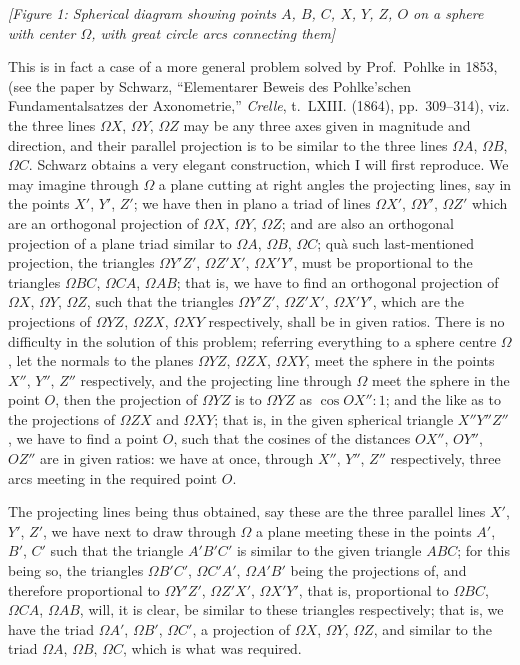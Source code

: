 \documentclass[11pt,a4paper]{article}
\theoremstyle{plain}
\theoremstyle{definition}
\theoremstyle{remark}
\begin{document}
\begin{center}
\textit{[Figure 1: Spherical diagram showing points $A$, $B$, $C$, $X$, $Y$, $Z$, $O$ on a sphere with center $\Omega$, with great circle arcs connecting them]}
\end{center}

This is in fact a case of a more general problem solved by Prof.~Pohlke in 1853, (see the paper by Schwarz, ``Elementarer Beweis des Pohlke'schen Fundamentalsatzes der Axonometrie,'' \textit{Crelle}, t.~LXIII. (1864), pp.~309--314), viz. the three lines $\Omega X$, $\Omega Y$, $\Omega Z$ may be any three axes given in magnitude and direction, and their parallel projection is to be similar to the three lines $\Omega A$, $\Omega B$, $\Omega C$. Schwarz obtains a very elegant construction, which I will first reproduce. We may imagine through $\Omega$ a plane cutting at right angles the projecting lines, say in the points $X'$, $Y'$, $Z'$; we have then in plano a triad of lines $\Omega X'$, $\Omega Y'$, $\Omega Z'$ which are an orthogonal projection of $\Omega X$, $\Omega Y$, $\Omega Z$; and are also an orthogonal projection of a plane triad similar to $\Omega A$, $\Omega B$, $\Omega C$; qu\`{a} such last-mentioned projection, the triangles $\Omega Y'Z'$, $\Omega Z'X'$, $\Omega X'Y'$, must be proportional to the triangles $\Omega BC$, $\Omega CA$, $\Omega AB$; that is, we have to find an orthogonal projection of $\Omega X$, $\Omega Y$, $\Omega Z$, such that the triangles $\Omega Y'Z'$, $\Omega Z'X'$, $\Omega X'Y'$, which are the projections of $\Omega YZ$, $\Omega ZX$, $\Omega XY$ respectively, shall be in given ratios. There is no difficulty in the solution of this problem; referring everything to a sphere centre $\Omega$, let the normals to the planes $\Omega YZ$, $\Omega ZX$, $\Omega XY$, meet the sphere in the points $X''$, $Y''$, $Z''$ respectively, and the projecting line through $\Omega$ meet the sphere in the point $O$, then the projection of $\Omega YZ$ is to $\Omega YZ$ as $\cos OX'' : 1$; and the like as to the projections of $\Omega ZX$ and $\Omega XY$; that is, in the given spherical triangle $X''Y''Z''$, we have to find a point $O$, such that the cosines of the distances $OX''$, $OY''$, $OZ''$ are in given ratios: we have at once, through $X''$, $Y''$, $Z''$ respectively, three arcs meeting in the required point $O$.

The projecting lines being thus obtained, say these are the three parallel lines $X'$, $Y'$, $Z'$, we have next to draw through $\Omega$ a plane meeting these in the points $A'$, $B'$, $C'$ such that the triangle $A'B'C'$ is similar to the given triangle $ABC$; for this being so, the triangles $\Omega B'C'$, $\Omega C'A'$, $\Omega A'B'$ being the projections of, and therefore proportional to $\Omega Y'Z'$, $\Omega Z'X'$, $\Omega X'Y'$, that is, proportional to $\Omega BC$, $\Omega CA$, $\Omega AB$, will, it is clear, be similar to these triangles respectively; that is, we have the triad $\Omega A'$, $\Omega B'$, $\Omega C'$, a projection of $\Omega X$, $\Omega Y$, $\Omega Z$, and similar to the triad $\Omega A$, $\Omega B$, $\Omega C$, which is what was required.
\end{document}

